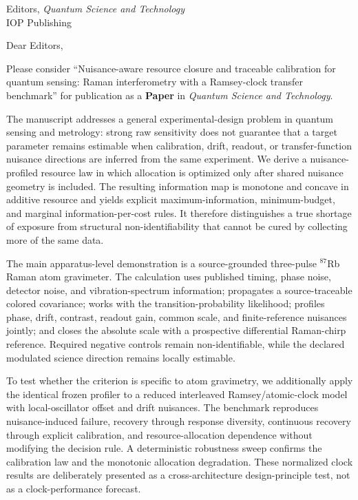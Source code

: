 \documentclass[10pt,a4paper]{letter}
\begin{document}
\begin{letter}{Editors, \textit{Quantum Science and Technology}\\IOP Publishing}
\opening{Dear Editors,}

Please consider ``Nuisance-aware resource closure and traceable calibration for quantum sensing: Raman interferometry with a Ramsey-clock transfer benchmark'' for publication as a \textbf{Paper} in \textit{Quantum Science and Technology}.

The manuscript addresses a general experimental-design problem in quantum sensing and metrology: strong raw sensitivity does not guarantee that a target parameter remains estimable when calibration, drift, readout, or transfer-function nuisance directions are inferred from the same experiment. We derive a nuisance-profiled resource law in which allocation is optimized only after shared nuisance geometry is included. The resulting information map is monotone and concave in additive resource and yields explicit maximum-information, minimum-budget, and marginal information-per-cost rules. It therefore distinguishes a true shortage of exposure from structural non-identifiability that cannot be cured by collecting more of the same data.

The main apparatus-level demonstration is a source-grounded three-pulse $^{87}$Rb Raman atom gravimeter. The calculation uses published timing, phase noise, detector noise, and vibration-spectrum information; propagates a source-traceable colored covariance; works with the transition-probability likelihood; profiles phase, drift, contrast, readout gain, common scale, and finite-reference nuisances jointly; and closes the absolute scale with a prospective differential Raman-chirp reference. Required negative controls remain non-identifiable, while the declared modulated science direction remains locally estimable.

To test whether the criterion is specific to atom gravimetry, we additionally apply the identical frozen profiler to a reduced interleaved Ramsey/atomic-clock model with local-oscillator offset and drift nuisances. The benchmark reproduces nuisance-induced failure, recovery through response diversity, continuous recovery through explicit calibration, and resource-allocation dependence without modifying the decision rule. A deterministic robustness sweep confirms the calibration law and the monotonic allocation degradation. These normalized clock results are deliberately presented as a cross-architecture design-principle test, not as a clock-performance forecast.


\end{letter}
\end{document}
